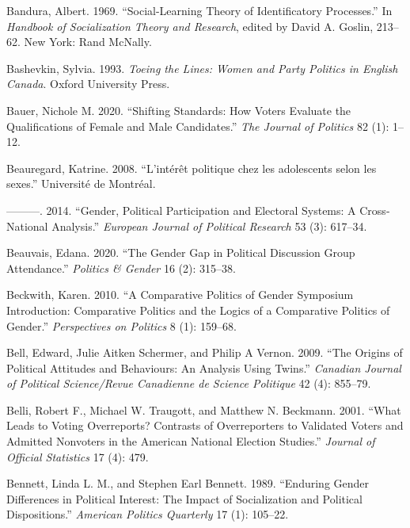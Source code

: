 \documentclass[
  letterpaper,
  DIV=11,
  numbers=noendperiod]{scrreprt}
\newlength{\cslhangindent}
\newenvironment{CSLReferences}[2] %
 {\begin{list}{}{%
  \setlength{\itemindent}{0pt}
  \setlength{\leftmargin}{0pt}
  \setlength{\parsep}{0pt}
  \ifodd #1
   \setlength{\leftmargin}{\cslhangindent}
   \setlength{\itemindent}{-1\cslhangindent}
  \fi
  \setlength{\itemsep}{#2\baselineskip}}}
 {\end{list}}
\begin{document}
\begin{CSLReferences}{1}{0}
Bandura, Albert. 1969. {``{Social-Learning Theory of Identificatory
Processes}.''} In \emph{{Handbook of Socialization Theory and
Research}}, edited by David A. Goslin, 213--62. New York: Rand McNally.

Bashevkin, Sylvia. 1993. \emph{{Toeing the Lines: Women and Party
Politics in English Canada}}. Oxford University Press.

Bauer, Nichole M. 2020. {``{Shifting Standards: How Voters Evaluate the
Qualifications of Female and Male Candidates}.''} \emph{The Journal of
Politics} 82 (1): 1--12.

Beauregard, Katrine. 2008. {``{L'intérêt politique chez les adolescents
selon les sexes}.''} Université de Montréal.

---------. 2014. {``{Gender, Political Participation and Electoral
Systems: A Cross-National Analysis}.''} \emph{European Journal of
Political Research} 53 (3): 617--34.

Beauvais, Edana. 2020. {``{The Gender Gap in Political Discussion Group
Attendance}.''} \emph{Politics \& Gender} 16 (2): 315--38.

Beckwith, Karen. 2010. {``{A Comparative Politics of Gender Symposium
Introduction: Comparative Politics and the Logics of a Comparative
Politics of Gender}.''} \emph{Perspectives on Politics} 8 (1): 159--68.

Bell, Edward, Julie Aitken Schermer, and Philip A Vernon. 2009. {``{The
Origins of Political Attitudes and Behaviours: An Analysis Using
Twins}.''} \emph{Canadian Journal of Political Science/Revue Canadienne
de Science Politique} 42 (4): 855--79.

Belli, Robert F., Michael W. Traugott, and Matthew N. Beckmann. 2001.
{``{What Leads to Voting Overreports? Contrasts of Overreporters to
Validated Voters and Admitted Nonvoters in the American National
Election Studies}.''} \emph{Journal of Official Statistics} 17 (4): 479.

Bennett, Linda L. M., and Stephen Earl Bennett. 1989. {``{Enduring
Gender Differences in Political Interest: The Impact of Socialization
and Political Dispositions}.''} \emph{American Politics Quarterly} 17
(1): 105--22.


\end{CSLReferences}
\end{document}
